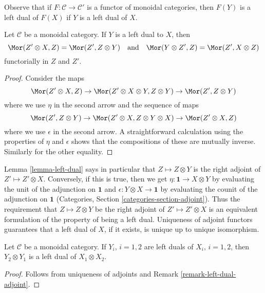 \noindent
Observe that if $F : \mathcal{C} \to \mathcal{C}'$ is a functor of
monoidal categories, then $F(Y)$ is a left dual of $F(X)$ if
$Y$ is a left dual of $X$.

\begin{lemma}
\label{lemma-left-dual}
Let $\mathcal{C}$ be a monoidal category. If $Y$ is a left dual to $X$,
then
$$
\Mor(Z' \otimes X, Z) = \Mor(Z', Z \otimes Y)
\quad\text{and}\quad
\Mor(Y \otimes Z', Z) = \Mor(Z', X \otimes Z)
$$
functorially in $Z$ and $Z'$.
\end{lemma}

\begin{proof}
Consider the maps
$$
\Mor(Z' \otimes X, Z) \to
\Mor(Z' \otimes X \otimes Y, Z \otimes Y) \to
\Mor(Z', Z \otimes Y)
$$
where we use $\eta$ in the second arrow
and the sequence of maps
$$
\Mor(Z', Z \otimes Y) \to
\Mor(Z' \otimes X, Z \otimes Y \otimes X) \to
\Mor(Z' \otimes X, Z)
$$
where we use $\epsilon$ in the second arrow. A straightforward calculation
using the properties of $\eta$ and $\epsilon$
shows that the compositions of these are mutually inverse.
Similarly for the other equality.
\end{proof}

\begin{remark}
\label{remark-left-dual-adjoint}
Lemma \ref{lemma-left-dual} says in particular that $Z \mapsto Z \otimes Y$
is the right adjoint of $Z' \mapsto Z' \otimes X$. Conversely, if this is
true, then we get $\eta : \mathbf{1} \to X \otimes Y$ by evaluating
the unit of the adjunction on $\mathbf{1}$
and $\epsilon : Y \otimes X \to \mathbf{1}$ by evaluating the counit
of the adjunction on $\mathbf{1}$
(Categories, Section \ref{categories-section-adjoint}). Thus the
requirement that $Z \mapsto Z \otimes Y$ be the right adjoint of
$Z' \mapsto Z' \otimes X$ is an equivalent formulation of the
property of being a left dual. Uniqueness of adjoint functors
guarantees that a left dual of $X$, if it exists, is unique up
to unique isomorphism.
\end{remark}

\begin{lemma}
\label{lemma-tensor-dual}
Let $\mathcal{C}$ be a monoidal category. If $Y_i$, $i = 1, 2$
are left duals of $X_i$, $i = 1, 2$, then $Y_2 \otimes Y_1$ is
a left dual of $X_1 \otimes X_2$.
\end{lemma}

\begin{proof}
Follows from uniqueness of adjoints and Remark \ref{remark-left-dual-adjoint}.
\end{proof}

